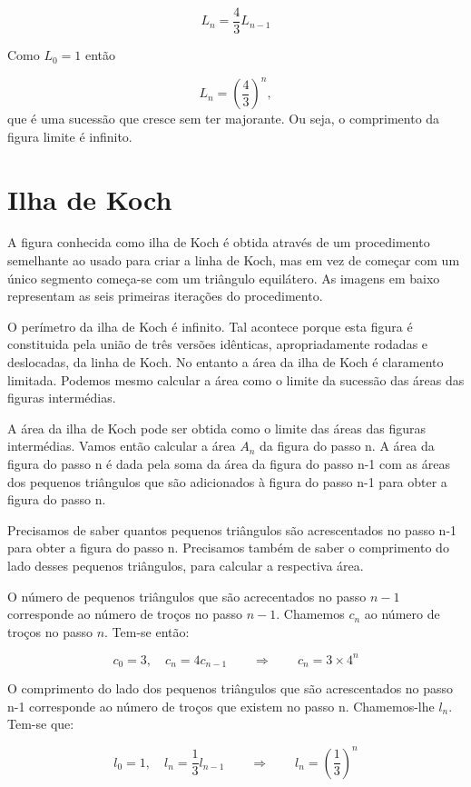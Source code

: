 \documentclass[11pt]{article}
\begin{document}
\[ L_n = \frac{4}{3}L_{n-1} \]

Como $L_0=1$  então

\[ L_n = \left(\frac{4}{3}\right)^n, \]
que é uma sucessão que cresce sem ter majorante. Ou seja, o
comprimento da figura limite é infinito.





\section{Ilha de Koch}

A figura conhecida como ilha de Koch é obtida através de um
procedimento semelhante ao usado para criar a linha de Koch, mas em
vez de começar com um único segmento começa-se com um triângulo
equilátero. As imagens em baixo representam as seis primeiras
iterações do procedimento.


O perímetro da ilha de Koch é infinito. Tal acontece porque esta
figura é constituida pela união de três versões idênticas,
apropriadamente rodadas e deslocadas, da linha de Koch. No entanto a
área da ilha de Koch é claramento limitada. Podemos mesmo calcular a
área como o limite da sucessão das áreas das figuras intermédias.

A área da ilha de Koch pode ser obtida como o limite das áreas das
figuras intermédias. Vamos então calcular a área $A_n$ da figura
do passo n. A área da figura do passo n é dada pela soma da área da
figura do passo n-1 com as áreas dos pequenos triângulos que são
adicionados à figura do passo n-1 para obter a figura do passo n.

Precisamos de saber quantos pequenos triângulos são acrescentados no
passo n-1 para obter a figura do passo n. Precisamos também de saber o
comprimento do lado desses pequenos triângulos, para calcular a
respectiva área.

O número de pequenos triângulos que são acrecentados no passo $n-1$
corresponde ao número de troços no passo $n-1$. Chamemos $c_n$ ao
número de troços no passo $n$. Tem-se então:

\[c_0=3, \quad c_n=4c_{n-1} \qquad \Rightarrow \qquad c_n = 3\times 4^n \]

O comprimento do lado dos pequenos triângulos que são acrescentados no
passo n-1 corresponde ao número de troços que existem no passo
n. Chamemos-lhe $l_n$. Tem-se que:

\[
 l_0=1, 
\quad l_n=\frac{1}{3}l_{n-1}
\qquad \Rightarrow
\qquad l_n = \left(\frac{1}{3}\right)^n
\]
\end{document}
